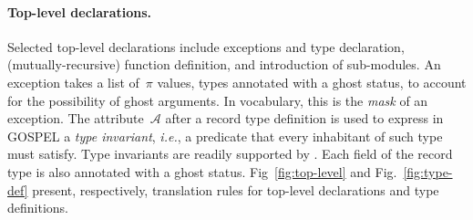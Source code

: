 \documentclass{easychair}
\newcommand{\GOSPEL}{{\textsf{GOSPEL}}\xspace}
\newcommand{\atts}{\mathcal{A}}
\newcommand\xrsquigarrow[1]{%
  \mathrel{%
    \begin{tikzpicture}[%
      baseline={(current bounding box.south)}
      ]
      \node[%
      ,inner sep=.44ex
      ,align=center
      ] (tmp) {$\scriptstyle #1$};
      \path[%
      ,draw,<-
      ,decorate,decoration={%
        ,zigzag
        ,amplitude=0.7pt
        ,segment length=1.2mm,pre length=3.5pt
      }
      ]
      (tmp.south east) -- (tmp.south west);
    \end{tikzpicture}
  }
}
\newcommand{\translate}[3]
{#1\xrsquigarrow{#2}#3}
\begin{document}
\paragraph{Top-level declarations.} Selected top-level declarations include
exceptions and type declaration, (mutually-recursive) function definition, and
introduction of sub-modules. An exception takes a list of~$\pi$ values, types
annotated with a ghost status, to account for the possibility of ghost
arguments. In \why vocabulary, this is the \emph{mask} of an exception. %
The attribute~$\atts$ after a record type definition is used to express in
\GOSPEL a \emph{type invariant}, \emph{i.e.}, a predicate that every inhabitant
of such type must satisfy. Type invariants are readily supported by \why.
%
%
Each field of the record type is also annotated with a ghost
status. Fig~\ref{fig:top-level} and Fig.~\ref{fig:type-def} present,
respectively, translation rules for \ocaml top-level declarations and type
definitions.
\end{document}
